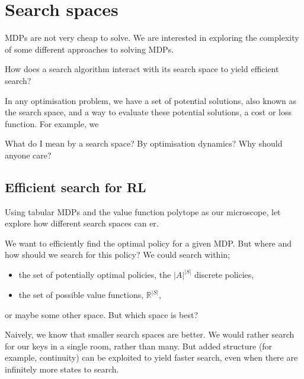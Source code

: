 \chapter{Search spaces}

MDPs are not very cheap to solve.
We are interested in exploring the complexity of some different approaches to solving MDPs.

\begin{displayquote}
How does a search algorithm interact with its search space to yield efficient search?
\end{displayquote}

In any optimisation problem, we have a set of potential solutions, also known as the search space,
and a way to evaluate these potential solutions, a cost or loss function. For example, we

What do I mean by a search space? By optimisation dynamics? Why should anyone care?


\section{Efficient search for RL}

Using tabular MDPs and the value function polytope as our microscope,
let explore how different search spaces can er.

We want to efficiently find the optimal policy for a given MDP. But where and how should we
search for this policy? We could search within;

\begin{itemize}
\tightlist
\item
the set of potentially optimal policies, the \(|A|^{|S|}\) discrete policies,
\item
the set of possible value functions, \(\mathbb R^{|S|}\),
\end{itemize}
or maybe some other space. But which space is best?

Naively, we know that smaller search spaces are better. We would rather
search for our keys in a single room, rather than many. But added
structure (for example, continuity) can be exploited to yield faster
search, even when there are infinitely more states to search.

